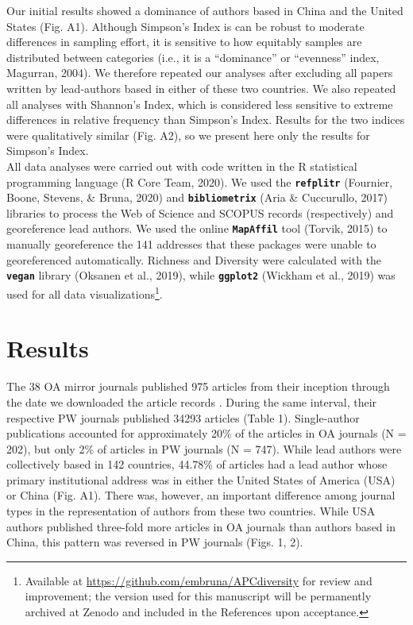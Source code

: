 \documentclass[
  english,
  man]{apa6}
\begin{document}
Our initial results showed a dominance of authors based in China and the United States (Fig. A1). Although Simpson's Index is can be robust to moderate differences in sampling effort, it is sensitive to how equitably samples are distributed between categories (i.e., it is a ``dominance'' or ``evenness'' index, Magurran, 2004). We therefore repeated our analyses after excluding all papers written by lead-authors based in either of these two countries. We also repeated all analyses with Shannon's Index, which is considered less sensitive to extreme differences in relative frequency than Simpson's Index. Results for the two indices were qualitatively similar (Fig. A2), so we present here only the results for Simpson's Index.\\
All data analyses were carried out with code written in the R statistical programming language (R Core Team, 2020). We used the \textbf{\texttt{refplitr}} (Fournier, Boone, Stevens, \& Bruna, 2020) and \textbf{\texttt{bibliometrix}} (Aria \& Cuccurullo, 2017) libraries to process the Web of Science and SCOPUS records (respectively) and georeference lead authors. We used the online \textbf{\texttt{MapAffil}} tool (Torvik, 2015) to manually georeference the 141 addresses that these packages were unable to georeferenced automatically. Richness and Diversity were calculated with the \textbf{\texttt{vegan}} library (Oksanen et al., 2019), while \textbf{\texttt{ggplot2}} (Wickham et al., 2019) was used for all data visualizations\footnote{Available at \url{https://github.com/embruna/APCdiversity} for review and improvement; the version used for this manuscript will be permanently archived at Zenodo and included in the References upon acceptance.}.

\hypertarget{results}{%
\section{Results}\label{results}}

The 38 OA mirror journals published 975 articles from their inception through the date we downloaded the article records . During the same interval, their respective PW journals published 34293 articles (Table 1). Single-author publications accounted for approximately 20\% of the articles in OA journals (N = 202), but only 2\% of articles in PW journals (N = 747). While lead authors were collectively based in 142 countries, 44.78\% of articles had a lead author whose primary institutional address was in either the United States of America (USA) or China (Fig. A1). There was, however, an important difference among journal types in the representation of authors from these two countries. While USA authors published three-fold more articles in OA journals than authors based in China, this pattern was reversed in PW journals (Figs. 1, 2).
\end{document}
